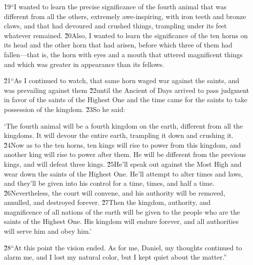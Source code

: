 \v{19}``I wanted to learn the precise significance of the fourth animal that was different from all the others, extremely awe-inspiring, with iron teeth and bronze claws, and that had devoured and crushed things, trampling under its feet whatever remained. \v{20}Also, I wanted to learn the significance of the ten horns on its head and the other horn that had arisen, before which three of them had fallen---that is, the horn with eyes and a mouth that uttered magnificent things and which was greater in appearance than its fellows.

\v{21}``As I continued to watch, that same horn waged war against the saints, and was prevailing against them \v{22}until the Ancient of Days arrived to pass judgment in favor of the saints of the Highest One and the time came for the saints to take possession of the kingdom. \v{23}So he said:

\begin{poetry}
\poeml `The fourth animal will be a fourth kingdom on the earth, different from all the kingdoms. It will devour the entire earth, trampling it down and crushing it. \v{24}Now as to the ten horns, ten kings will rise to power from this kingdom, and another king will rise to power after them. He will be different from the previous kings, and will defeat three kings. \v{25}He'll speak out against the Most High and wear down the saints of the Highest One. He'll attempt to alter times and laws, and they'll be given into his control for a time, times, and half a time. \v{26}Nevertheless, the court will convene, and his authority will be removed, annulled, and destroyed forever. \v{27}Then the kingdom, authority, and magnificence of all nations of the earth will be given to the people who are the saints of the Highest One. His kingdom will endure forever, and all authorities will serve him and obey him.'
\end{poetry}

\v{28}``At this point the vision ended. As for me, Daniel, my thoughts continued to alarm me, and I lost my natural color, but I kept quiet about the matter.''

